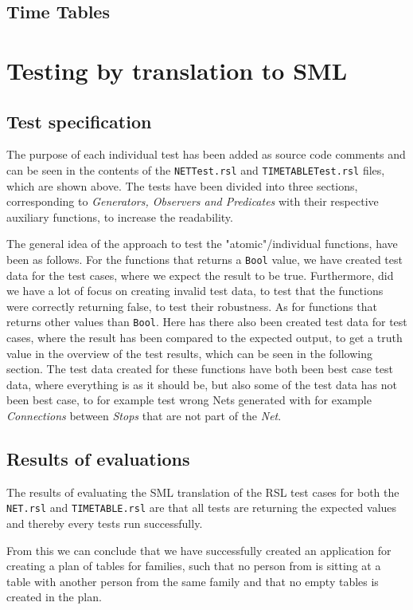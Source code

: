 \documentclass[a4]{article}
\begin{document}
\subsection{Time Tables}



\section{Testing by translation to SML}

\subsection{Test specification}

The purpose of each individual test has been added as source code comments and can be seen in the contents of the \verb=NETTest.rsl=  and \verb=TIMETABLETest.rsl= files, which are shown above. The tests have been divided into three sections, corresponding to \emph{Generators, Observers and Predicates} with their respective auxiliary functions, to increase the readability.

The general idea of the approach to test the "atomic"/individual functions, have been as follows. For the functions that returns a \verb=Bool= value, we have created test data for the test cases, where we expect the result to be true. Furthermore, did we have a lot of focus on creating invalid test data, to test that the functions were correctly returning false, to test their robustness. As for functions that returns other values than \verb=Bool=. 
Here has there also been created test data for test cases, where the result has been compared to the expected output, to get a truth value in the overview of the test results, which can be seen in the following section. The test data created for these functions have both been best case test data, where everything is as it should be, but also some of the test data has not been best case, to for example test wrong Nets generated with for example \emph{Connections} between \emph{Stops} that are not part of the \emph{Net}.

\subsection{Results of evaluations}

The results of evaluating the SML translation of the RSL test cases for both the \verb=NET.rsl= and \verb=TIMETABLE.rsl= are that all tests are returning the expected values and thereby every tests run successfully.

From this we can conclude that we have successfully created an application for creating a plan of tables for families, such that no person from is sitting at a table with another person from the same family and that no empty tables is created in the plan.
\end{document}
